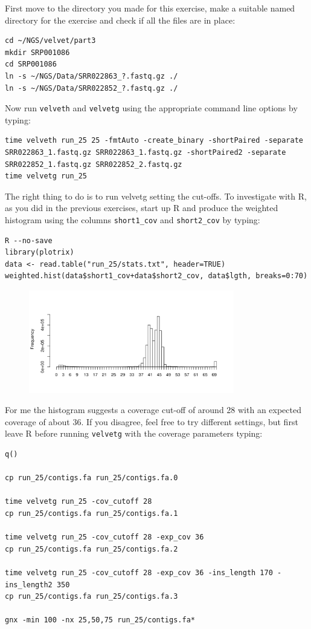 \begin{steps}
First move to the directory you made for this exercise, make a suitable named
directory for the exercise and check if all the files are in place:
\begin{lstlisting}
cd ~/NGS/velvet/part3
mkdir SRP001086
cd SRP001086
ln -s ~/NGS/Data/SRR022863_?.fastq.gz ./
ln -s ~/NGS/Data/SRR022852_?.fastq.gz ./
\end{lstlisting}

Now run \texttt{velveth} and \texttt{velvetg} using the appropriate command line
options by typing:
\begin{lstlisting}
time velveth run_25 25 -fmtAuto -create_binary -shortPaired -separate SRR022863_1.fastq.gz SRR022863_1.fastq.gz -shortPaired2 -separate SRR022852_1.fastq.gz SRR022852_2.fastq.gz
time velvetg run_25
\end{lstlisting}

The right thing to do is to run velvetg setting the cut-offs. To investigate
with R, as you did in the previous exercises, start up R and produce the
weighted histogram using the columns \texttt{short1\_cov} and
\texttt{short2\_cov} by typing:
\begin{lstlisting}
R --no-save
library(plotrix) 
data <- read.table("run_25/stats.txt", header=TRUE) 
weighted.hist(data$short1_cov+data$short2_cov, data$lgth, breaks=0:70)
\end{lstlisting}

\begin{figure}[H]
\centering
\includegraphics[width=0.8\textwidth]{de_novo/velvet/velvet_Rplot004.png}
\label{fig:velvet_Rplot004}
\end{figure}

For me the histogram suggests a coverage cut-off of around 28
with an expected coverage of about 36. If you disagree, feel free to try
different settings, but first leave R before running \texttt{velvetg} with the coverage
parameters typing:
\begin{lstlisting}
q()

cp run_25/contigs.fa run_25/contigs.fa.0

time velvetg run_25 -cov_cutoff 28 
cp run_25/contigs.fa run_25/contigs.fa.1

time velvetg run_25 -cov_cutoff 28 -exp_cov 36 
cp run_25/contigs.fa run_25/contigs.fa.2

time velvetg run_25 -cov_cutoff 28 -exp_cov 36 -ins_length 170 -ins_length2 350
cp run_25/contigs.fa run_25/contigs.fa.3

gnx -min 100 -nx 25,50,75 run_25/contigs.fa*
\end{lstlisting}

\end{steps}

